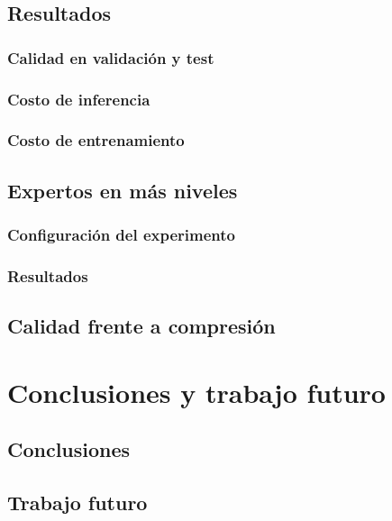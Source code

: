 \documentclass[
  11pt,
  oneside,
  english,
  spanish,
  singlespacing,
  headsepline
]{MastersDoctoralThesis}
\newcommand{\printbibliography}{%
  }
\begin{document}
\section{Resultados}
\label{sec:compresion-resultados}

\subsection{Calidad en validación y test}
\label{sec:calidad}

\subsection{Costo de inferencia}
\label{sec:costo-inferencia}

\subsection{Costo de entrenamiento}
\label{sec:costo-entrenamiento}

\section{Expertos en más niveles}
\label{sec:niveles}

\subsection{Configuración del experimento}
\label{sec:niveles-config}

\subsection{Resultados}
\label{sec:niveles-resultados}

\section{Calidad frente a compresión}
\label{sec:calidad-compresion}

\chapter{Conclusiones y trabajo futuro}
\label{chap:conclusiones}

\section{Conclusiones}
\label{sec:conclusiones}

\section{Trabajo futuro}
\label{sec:trabajo-futuro}

\appendix
\printbibliography
\end{document}
